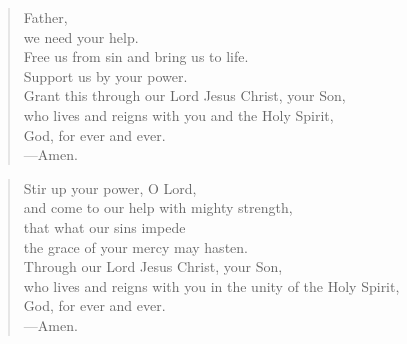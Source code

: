 \prayer

\setlength{\vleftmargin}{\prayerleftmargini}

\begin{verse}
Father,\\
we need your help.\\
Free us from sin and bring us to life.\\
Support us by your power.\\
Grant this through our Lord Jesus Christ, your Son,\\
who lives and reigns with you and the Holy Spirit,\\
God, for ever and ever.\\
{\color{red}---\thinspace}Amen.
\end{verse}


\begin{verse}
Stir up your power, O Lord,\\
and come to our help with mighty strength,\\
that what our sins impede\\
the grace of your mercy may hasten.\\
Through our Lord Jesus Christ, your Son,\\
who lives and reigns with you in the unity of the Holy Spirit,\\
God, for ever and ever.\\
{\color{red}---\thinspace}Amen.
\end{verse}

\setlength{\vleftmargin}{\defleftmargini}